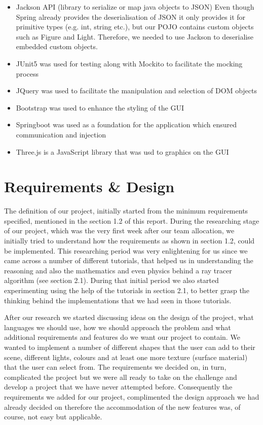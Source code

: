 \documentclass[11pt,a4paper]{article}
\begin{document}
\begin{itemize}[nosep, wide=20pt, leftmargin=*, after=\strut]
    \item Jackson API (library to serialize or map java objects to JSON)
 Even though Spring already provides the deserialisation of JSON  it only provides it for primitive types (e.g. int, string etc.), but our POJO contains custom objects such as Figure and Light. Therefore, we needed to use Jackson to deserialise embedded custom objects.
 
    \item JUnit5 was used for testing along with Mockito to facilitate the mocking process
    \item JQuery was used to facilitate the manipulation and selection of DOM objects 
    \item Bootstrap was used to enhance the styling of the GUI 
    \item Springboot was used as a foundation for the application which ensured communication and injection
    \item Three.js is a JavaScript library that was usd to graphics on the GUI 
\end{itemize}

\section{Requirements & Design}
The definition of our project, initially started from the minimum requirements specified, mentioned in the section 1.2 of this report. During the researching stage of our project, which was the very first week after our team allocation, we initially tried to understand how the requirements as shown in section 1.2, could be implemented. This researching period was very enlightening for us since we came across a number of different tutorials, that helped us in understanding the reasoning and also the mathematics and even physics behind a ray tracer algorithm (see section 2.1). During that initial period we also started experimenting using the help of the tutorials in section 2.1, to better grasp the thinking behind the implementations that we had seen in those tutorials. 

After our research we started discussing ideas on the design of the project, what languages we should use, how we should approach the problem and what additional requirements and features do we want our project to contain. We wanted to implement a number of different shapes that the user can add to their scene, different lights, colours and at least one more texture (surface material) that the user can select from. The requirements we decided on, in turn, complicated the project but we were all ready to take on the challenge and develop a project that we have never attempted before. Consequently the requirements we added for our project, complimented the design approach we had already decided on therefore the accommodation of the new features was, of course, not easy but applicable.
\end{document}
